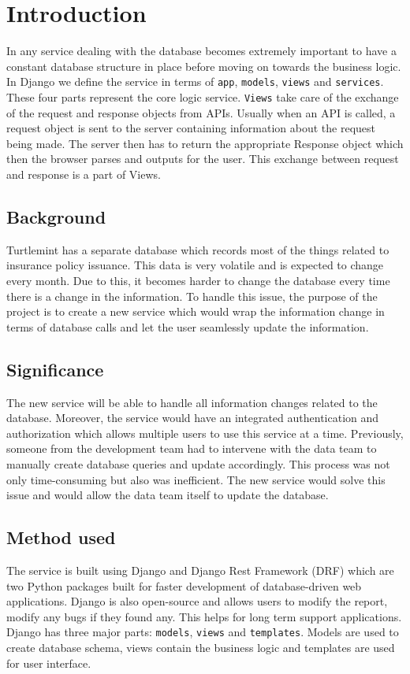 \chapter{Introduction}

In any service dealing with the database becomes extremely important to
have a constant database structure in place before moving on towards the
business logic. In Django we define the service in terms of \texttt{app},
\texttt{models}, \texttt{views} and \texttt{services}. These four parts
represent the core logic service.
\texttt{Views} take care of the exchange of the request and response objects from APIs.
Usually when an API is called, a request object is sent to the server containing
information about the request being made. The server then has to return the
appropriate Response object which then the browser parses and outputs for the
user. This exchange between request and response is a part of Views.

\section{Background}
Turtlemint has a separate database which records most of the things related to
insurance policy issuance. This data is very volatile and is expected to change
every month. Due to this, it becomes harder to change the database every time
there is a change in the information. To handle this issue, the purpose of the
project is to create a new service which would wrap the information change in
terms of database calls and let the user seamlessly update the information.

\section{Significance}
The new service will be able to handle all information changes related to the
database. Moreover, the service would have an integrated authentication and
authorization which allows multiple users to use this service at a time.
Previously, someone from the development team had to intervene with the data
team to manually create database queries and update accordingly. This process
was not only time-consuming but also was inefficient. The new service would
solve this issue and would allow the data team itself to update the database.

\section{Method used}
The service is built using Django and Django Rest Framework (DRF) which are
two Python packages built for faster development of database-driven web
applications. Django is also open-source and allows users to modify the
report, modify any bugs if they found any. This helps for long term
support applications. Django has three major parts: \texttt{models},
\texttt{views} and \texttt{templates}. Models are used to create database
schema, views contain the business logic and templates are used for user
interface.

